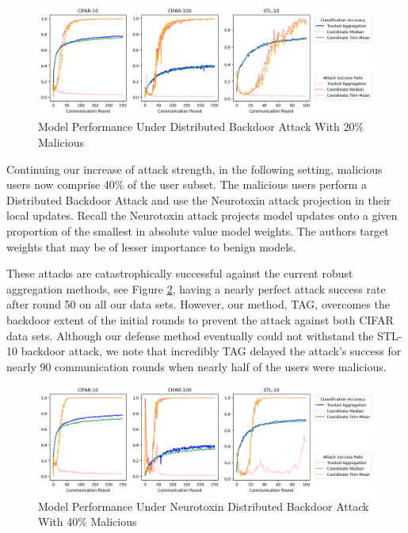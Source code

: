 \documentclass{article} %
\begin{document}
\begin{figure}[H]
    \centering
    \includegraphics[width=\textwidth]{make_article/make_visuals/visuals/accuracy--n_malicious2--dba1--beta0.2.png}
    \caption{Model Performance Under Distributed Backdoor Attack With 20\% Malicious}
    \label{fig: accuracy--dba1--n_malicious2}
\end{figure}

Continuing our increase of attack strength, in the following setting, malicious users now comprise 40\% of the user subset. The malicious users perform a Distributed Backdoor Attack and use the Neurotoxin attack projection in their local updates. Recall the Neurotoxin attack projects model updates onto a given proportion of the smallest in absolute value model weights. The authors \cite{neurotoxin} target weights that may be of lesser importance to benign models. 

These attacks are catastrophically successful against the current robust aggregation methods, see Figure \ref{fig: accuracy--dba1--n_malicious4--neuro1}, having a nearly perfect attack success rate after round 50 on all our data sets. However, our method, TAG, overcomes the backdoor extent of the initial rounds to prevent the attack against both CIFAR data sets. Although our defense method eventually could not withstand the STL-10 backdoor attack, we note that incredibly TAG delayed the attack's success for nearly 90 communication rounds when nearly half of the users were malicious.

\begin{figure}[H]
    \centering
    \includegraphics[width=\textwidth]{make_article/make_visuals/visuals/accuracy--n_malicious4--dba1--beta0.2--neuro_p0.1.png}
    \caption{Model Performance Under Neurotoxin Distributed Backdoor Attack With 40\% Malicious}
    \label{fig: accuracy--dba1--n_malicious4--neuro1}
\end{figure}
\end{document}
